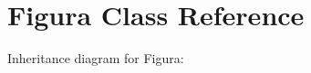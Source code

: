 \hypertarget{classFigura}{}\section{Figura Class Reference}
\label{classFigura}


Inheritance diagram for Figura\+:
